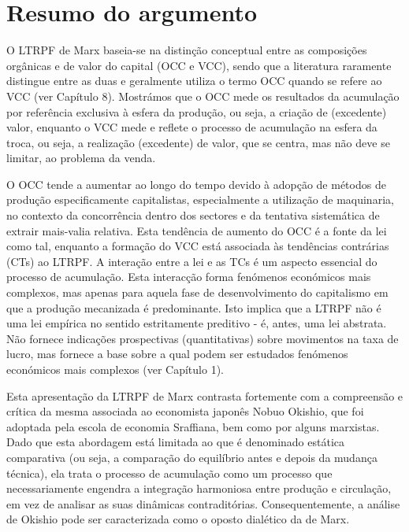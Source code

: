 \section{Resumo do argumento}
 \par 
O LTRPF de Marx baseia-se na distinção conceptual entre as composições orgânicas e de valor do capital (OCC e VCC), sendo que a literatura raramente distingue entre as duas e geralmente utiliza o termo OCC quando se refere ao VCC (ver Capítulo {\color{blue}8}). Mostrámos que o OCC mede os resultados da acumulação por referência exclusiva à esfera da produção, ou seja, a criação de (excedente) valor, enquanto o VCC mede e reflete o processo de acumulação na esfera da troca, ou seja, a realização (excedente) de valor, que se centra, mas não deve se limitar, ao problema da venda.
 \par 
O OCC tende a aumentar ao longo do tempo devido à adopção de métodos de produção especificamente capitalistas, especialmente a utilização de maquinaria, no contexto da concorrência dentro dos sectores e da tentativa sistemática de extrair mais-valia relativa. Esta tendência de aumento do OCC é a fonte da lei como tal, enquanto a formação do VCC está associada às tendências contrárias (CTs) ao LTRPF. A interação entre a lei e as TCs é um aspecto essencial do processo de acumulação. Esta interacção forma fenómenos económicos mais complexos, mas apenas para aquela fase de desenvolvimento do capitalismo em que a produção mecanizada é predominante. Isto implica que a LTRPF não é uma lei empírica no sentido estritamente preditivo - é, antes, uma lei abstrata. Não fornece indicações prospectivas (quantitativas) sobre movimentos na taxa de lucro, mas fornece a base sobre a qual podem ser estudados fenómenos económicos mais complexos (ver Capítulo {\color{blue}1}).
 \par 
Esta apresentação da LTRPF de Marx contrasta fortemente com a compreensão e crítica da mesma associada ao economista japonês Nobuo Okishio, que foi adoptada pela escola de economia Sraffiana, bem como por alguns marxistas. Dado que esta abordagem está limitada ao que é denominado estática comparativa (ou seja, a comparação do equilíbrio antes e depois da mudança técnica), ela trata o processo de acumulação como um processo que necessariamente engendra a integração harmoniosa entre produção e circulação, em vez de analisar as suas dinâmicas contraditórias. Consequentemente, a análise de Okishio pode ser caracterizada como o oposto dialético da de Marx.
 \par 
